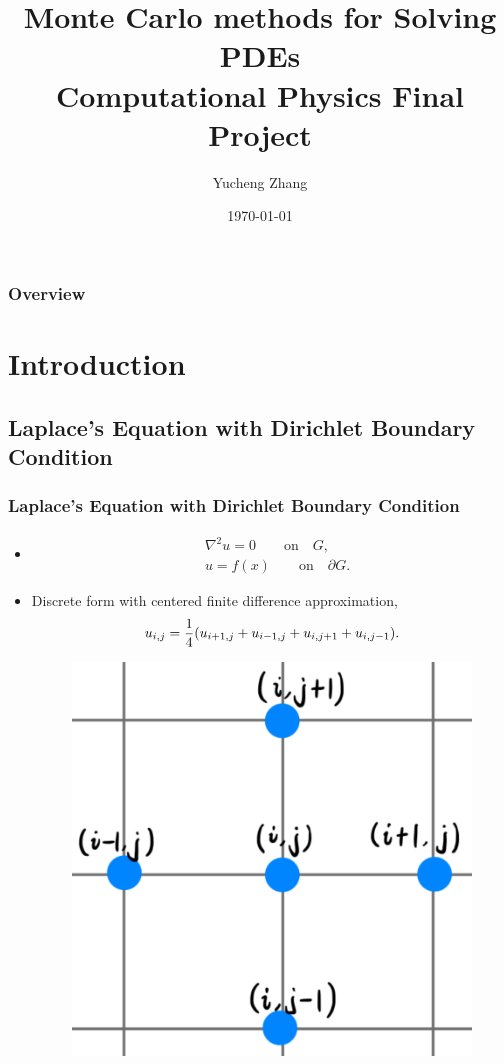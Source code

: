 \documentclass{beamer}
\title[MC methods for PDEs]{Monte Carlo methods for Solving PDEs\\Computational Physics Final Project}
\author{Yucheng Zhang}
\institute[Physics @ NYU]
{
Department of Physics, New York University \\
\medskip
\textit{yz4035@nyu.edu}
}
\date{\today}
\begin{document}
\begin{frame}
\titlepage
\end{frame}

\begin{frame}
\frametitle{Overview}
\tableofcontents
\end{frame}


\section{Introduction}


\subsection{Laplace's Equation with Dirichlet Boundary Condition}

\begin{frame}
\frametitle{Laplace's Equation with Dirichlet Boundary Condition}
\begin{itemize}
\item
\begin{equation}
    \begin{split}
        &\nabla^2 u = 0 \qquad \text{on}\quad G, \\
        &u = f(x) \qquad \text{on}\quad \partial G.
    \end{split}
\end{equation}
\item
Discrete form with centered finite difference approximation,
\begin{equation}
    u_{i,j} = \frac{1}{4} \qty(u_{i+1,j}+u_{i-1,j}+u_{i,j+1}+u_{i,j-1}).
\end{equation}
\begin{figure}[htbp]
    \centering
    \includegraphics[width=.3\textwidth]{./figs/disc}
\end{figure}
\end{itemize}
\end{frame}
\end{document}
